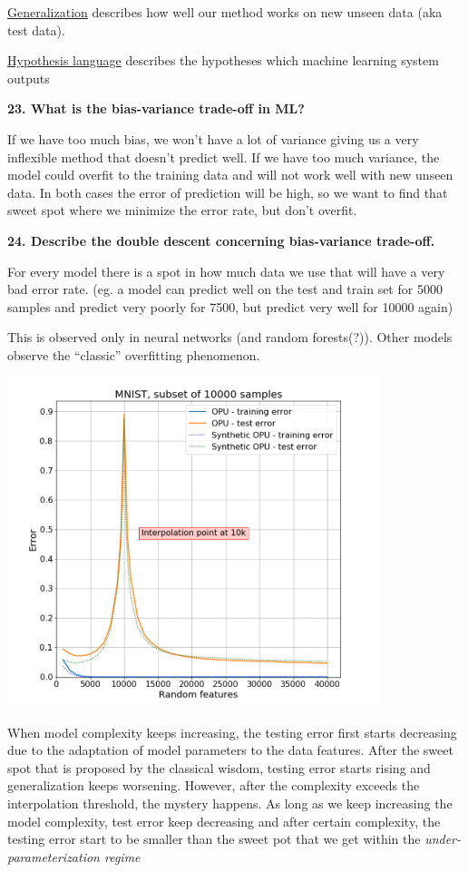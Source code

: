 \underline{Generalization} describes how well our method works on new
unseen data (aka test data).

\underline{Hypothesis language} describes the hypotheses which machine
learning system outputs

\textbf{23. What is the bias-variance trade-off in ML?}

If we have too much bias, we won't have a lot of variance giving us a
very inflexible method that doesn't predict well. If we have too much
variance, the model could overfit to the training data and will not work
well with new unseen data. In both cases the error of prediction will be
high, so we want to find that sweet spot where we minimize the error
rate, but don't overfit.

\textbf{24. Describe the double descent concerning bias-variance
trade-off.}

For every model there is a spot in how much data we use that will have a
very bad error rate. (eg. a model can predict well on the test and train
set for 5000 samples and predict very poorly for 7500, but predict very
well for 10000 again)

This is observed only in neural networks (and random forests(?)). Other
models observe the ``classic'' overfitting phenomenon.

\includegraphics[width=4.26436in,height=3.78646in]{media/image1.png}

When model complexity keeps increasing, the testing error first starts
decreasing due to the adaptation of model parameters to the data
features. After the sweet spot that is proposed by the classical wisdom,
testing error starts rising and generalization keeps worsening. However,
after the complexity exceeds the interpolation threshold, the mystery
happens. As long as we keep increasing the model complexity, test error
keep decreasing and after certain complexity, the testing error start to
be smaller than the sweet pot that we get within the
\emph{under-parameterization regime}

